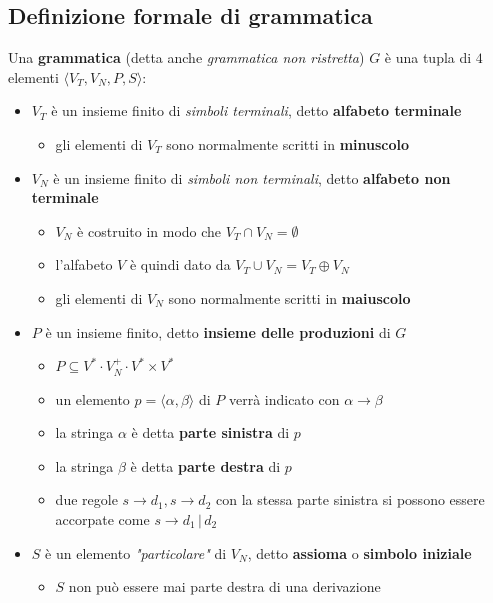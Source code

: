 \documentclass[italian, 10pt]{article}
\begin{document}


\subsection{Definizione formale di grammatica}

Una \textbf{grammatica} (detta anche \textit{grammatica non ristretta}) \(G\) è una tupla di \(4\) elementi \(\langle V_T, V_N, P, S \rangle\):

\begin{itemize}
  \item \(V_T\) è un insieme finito di \textit{simboli terminali}, detto \textbf{alfabeto terminale}
        \begin{itemize}[label=\(\rightarrow\)]
          \item gli elementi di \(V_T\) sono normalmente scritti in \textbf{minuscolo}
        \end{itemize}
  \item \(V_N\) è un insieme finito di \textit{simboli non terminali}, detto \textbf{alfabeto non terminale}
        \begin{itemize}[label=\(\rightarrow\)]
          \item \(V_N\) è costruito in modo che \(V_T \cap V_N = \emptyset\)
          \item l'alfabeto \(V\) è quindi dato da \(V_T \cup V_N = V_T \oplus V_N\)
          \item gli elementi di \(V_N\) sono normalmente scritti in \textbf{maiuscolo}
        \end{itemize}
  \item \(P\) è un insieme finito, detto \textbf{insieme delle produzioni} di \(G\)
        \begin{itemize}
          \item \(P \subseteq V^\ast \cdot V_N^+ \cdot V^\ast \times V^\ast\)
          \item un elemento \(p = \langle \alpha, \beta \rangle\) di \(P\) verrà indicato con \(\alpha \rightarrow \beta\)
          \item la stringa \(\alpha\) è detta \textbf{parte sinistra} di \(p\)
          \item la stringa \(\beta\) è detta \textbf{parte destra} di \(p\)
          \item due regole \(s \rightarrow d_1, s \rightarrow d_2\) con la stessa parte sinistra si possono essere accorpate come \(s \rightarrow d_1 \, | \, d_2\)
        \end{itemize}
  \item \(S\) è un elemento \textit{"particolare"} di \(V_N\), detto \textbf{assioma} o \textbf{simbolo iniziale}
        \begin{itemize}[label=\(\rightarrow\)]
          \item \(S\) non può essere mai parte destra di una derivazione
        \end{itemize}
\end{itemize}
\end{document}

